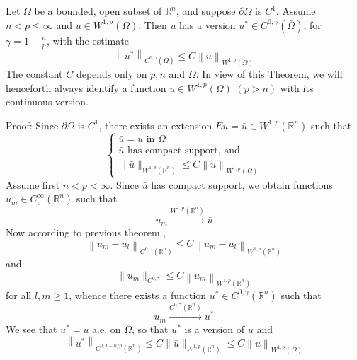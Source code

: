 \begin{theorem}
    Let $\Omega$ be a bounded, open subset of $\mathbb{R}^n$, and suppose $\partial \Omega$ is $C^1$. Assume $n<p \leq \infty$ and $u \in W^{1, p}\left(\Omega\right)$. Then $u$ has a version $u^* \in C^{0, \gamma}(\bar{\Omega})$, for $\gamma=1-\frac{n}{p}$, with the estimate
    $$
        \left\|u^*\right\|_{C^{0, \gamma}(\bar{\Omega})} \leq C\left\|u\right\|_{W^{1, p}\left(\Omega\right)}
    $$
    The constant $C$ depends only on $p, n$ and $\Omega$.
    In view of this Theorem, we will henceforth always identify a function $u \in W^{1, p}\left(\Omega\right)$ $(p>n)$ with its continuous version.

    Proof:
    Since $\partial \Omega$ is $C^1$, there exists an extension $E u=\bar{u} \in W^{1, p}\left(\mathbb{R}^n\right)$ such that
    \begin{equation*}
        \left\{\begin{array}{l}
            \bar{u}=u \text { in } \Omega              \\
            \bar{u} \text { has compact support, and } \\
            \|\bar{u}\|_{W^{1, p}\left(\mathbb{R}^n\right)} \leq C\left\|u\right\|_{W^{1, p}\left(\Omega\right)}
        \end{array}\right.
    \end{equation*}
    Assume first $n<p<\infty$. Since $\bar{u}$ has compact support, we obtain functions $u_m \in C_c^{\infty}\left(\mathbb{R}^n\right)$ such that
    $$
        u_m \xrightarrow{W^{1, p}\left(\mathbb{R}^n\right)} \bar{u}
    $$
    Now according to previous theorem ,
    $$\left\|u_m-u_l\right\|_{C^{0,\gamma}\left(\mathbb{R}^n\right)}
        \leq
        C\left\|u_m-u_l\right\|_{W^{1, p}\left(\mathbb{R}^n\right)}$$
    and
    $$\|u_m\|_{C^{0,\gamma}}\leq C\left\|u_m\right\|_{W^{1, p}\left(\mathbb{R}^n\right)}$$
    for all $l, m \geq 1$,
    whence there exists a function $u^* \in C^{0,\gamma}\left(\mathbb{R}^n\right)$ such that
    \begin{equation*}
        u_m \xrightarrow{C^{0,\gamma}(\mathbb{R}^n)} u^*
    \end{equation*}
    We see that $u^*=u$ a.e. on $\Omega$, so that $u^*$ is a version of $u$ and
    \begin{equation*}
        \left\|u^*\right\|_{C^{0,1-n / p}\left(\mathbb{R}^n\right)}
        \leq C\|\bar{u}\|_{W^{1, p}\left(\mathbb{R}^n\right)}
        \leq C\left\|u\right\|_{W^{1,p}\left(\Omega\right)}
    \end{equation*}


\end{theorem}
